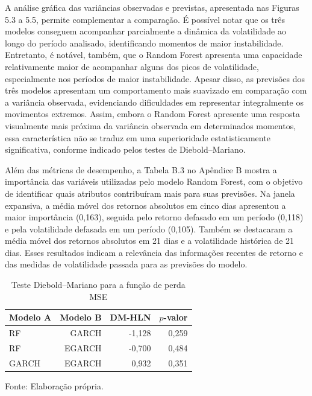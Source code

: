 A análise gráfica das variâncias observadas e previstas, apresentada nas Figuras 5.3 a 5.5, permite complementar a comparação. É possível notar que os três 
modelos conseguem acompanhar parcialmente a dinâmica da volatilidade ao longo do período analisado, identificando momentos de maior instabilidade. Entretanto, 
é notável, também, que o Random Forest apresenta uma capacidade relativamente maior de acompanhar alguns dos picos de volatilidade, especialmente 
nos períodos de maior instabilidade. Apesar disso, as previsões dos três modelos apresentam um comportamento mais suavizado em comparação com a variância observada, 
evidenciando dificuldades em representar integralmente os movimentos extremos. Assim, embora o Random Forest apresente uma resposta visualmente mais próxima da variância 
observada em determinados momentos, essa característica não se traduz em uma superioridade estatisticamente significativa, conforme indicado pelos testes de Diebold–Mariano.

Além das métricas de desempenho, a Tabela B.3 no Apêndice B mostra a importância das variáveis utilizadas pelo modelo Random Forest, com o objetivo de identificar quais atributos contribuíram 
mais para suas previsões. Na janela expansiva, a média móvel dos retornos absolutos em cinco dias apresentou a maior importância (0,163), seguida pelo retorno defasado em um 
período (0,118) e pela volatilidade defasada em um período (0,105). Também se destacaram a média móvel dos retornos absolutos em 21 dias e a volatilidade histórica de 21 dias. 
Esses resultados indicam a relevância das informações recentes de retorno e das medidas de volatilidade passada para as previsões do modelo.

\begin{table}[!htbp]
    \centering
    \caption{Teste Diebold--Mariano para a função de perda MSE}
    \label{tab:dm_mse}
    \begin{tabular}{lrrr}
        \toprule
        Modelo A & Modelo B & DM-HLN & $p$-valor \\
        \midrule
        RF    & GARCH  & -1,128 & 0,259 \\
        RF    & EGARCH & -0,700 & 0,484 \\
        GARCH & EGARCH &  0,932 & 0,351 \\
        \bottomrule
    \end{tabular}
    \begin{center}
        \footnotesize Fonte: Elaboração própria.
    \end{center}
\end{table}

